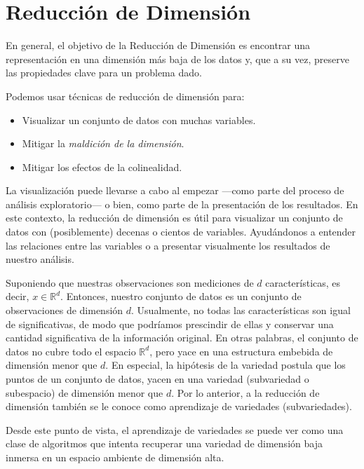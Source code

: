 \documentclass{article}
\numberwithin{equation}{section}
\theoremstyle{remark}
\theoremstyle{definition}
\theoremstyle{remark}
\theoremstyle{remark}
\begin{document}
\section{Reducción de Dimensión}
En general, el objetivo de la Reducción de Dimensión es encontrar una representación en una 
dimensión más baja de los datos y, que a su vez, preserve las propiedades clave para un problema
dado.

Podemos usar técnicas de reducción de dimensión para:

\begin{itemize}
    \item Visualizar un conjunto de datos con muchas variables.
    \item Mitigar la \textit{maldición de la dimensión}.
    \item Mitigar los efectos de la colinealidad.
\end{itemize}

La visualización puede llevarse a cabo al empezar ---como parte del proceso de análisis exploratorio--- 
o bien, como parte de la presentación de los resultados. En este contexto, la reducción de dimensión 
es útil para visualizar un conjunto de datos con (posiblemente) decenas o cientos de variables.
Ayudándonos a entender las relaciones entre las variables o a presentar visualmente los resultados de
nuestro análisis.

Suponiendo que nuestras observaciones son mediciones de $d$ características, es decir, $x \in \mathbb{R}^d$.
Entonces, nuestro conjunto de datos es un conjunto de observaciones de dimensión $d$.
Usualmente, no todas las características son igual de significativas, de modo que podríamos prescindir de ellas
y conservar una cantidad significativa de la información original. En otras palabras, el conjunto de datos
no cubre todo el espacio $\mathbb{R}^d$, pero yace en una estructura embebida de dimensión menor que $d$. En especial,
la hipótesis de la variedad postula que los puntos de un conjunto de datos, yacen en una variedad (subvariedad o subespacio)
de dimensión menor que $d$.
Por lo anterior, a la reducción de dimensión también se le conoce como aprendizaje de variedades (subvariedades).

Desde este punto de vista, el aprendizaje de variedades se puede ver como una clase de algoritmos que intenta recuperar una variedad
de dimensión baja inmersa en un espacio ambiente de dimensión alta.
\end{document}
